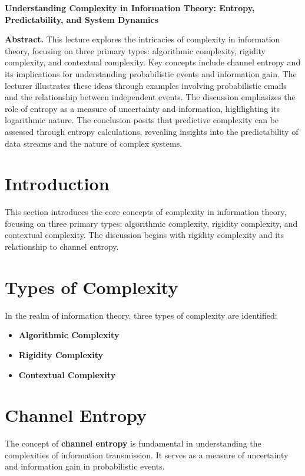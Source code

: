 \documentclass[a4paper]{article}
\begin{document}
\begin{center}
{\LARGE \textbf{Understanding Complexity in Information Theory: Entropy, Predictability, and System Dynamics}}\\[1em]
\end{center}

\textbf{Abstract.} This lecture explores the intricacies of complexity in information theory, focusing on three primary types: algorithmic complexity, rigidity complexity, and contextual complexity. Key concepts include channel entropy and its implications for understanding probabilistic events and information gain. The lecturer illustrates these ideas through examples involving probabilistic emails and the relationship between independent events. The discussion emphasizes the role of entropy as a measure of uncertainty and information, highlighting its logarithmic nature. The conclusion posits that predictive complexity can be assessed through entropy calculations, revealing insights into the predictability of data streams and the nature of complex systems.

\section{Introduction}
This section introduces the core concepts of complexity in information theory, focusing on three primary types: algorithmic complexity, rigidity complexity, and contextual complexity. The discussion begins with rigidity complexity and its relationship to channel entropy.

\section{Types of Complexity}
In the realm of information theory, three types of complexity are identified:

\begin{itemize}
    \item \textbf{Algorithmic Complexity}
    \item \textbf{Rigidity Complexity}
    \item \textbf{Contextual Complexity}
\end{itemize}

\section{Channel Entropy}
The concept of \textbf{channel entropy} is fundamental in understanding the complexities of information transmission. It serves as a measure of uncertainty and information gain in probabilistic events.
\end{document}

